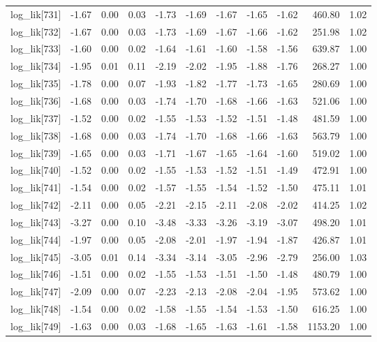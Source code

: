 \begin{table}[ht]
\begin{tabular}{rrrrrrrrrrr}
  log\_lik[731] & -1.67 & 0.00 & 0.03 & -1.73 & -1.69 & -1.67 & -1.65 & -1.62 & 460.80 & 1.02 \\ 
  log\_lik[732] & -1.67 & 0.00 & 0.03 & -1.73 & -1.69 & -1.67 & -1.66 & -1.62 & 251.98 & 1.02 \\ 
  log\_lik[733] & -1.60 & 0.00 & 0.02 & -1.64 & -1.61 & -1.60 & -1.58 & -1.56 & 639.87 & 1.00 \\ 
  log\_lik[734] & -1.95 & 0.01 & 0.11 & -2.19 & -2.02 & -1.95 & -1.88 & -1.76 & 268.27 & 1.00 \\ 
  log\_lik[735] & -1.78 & 0.00 & 0.07 & -1.93 & -1.82 & -1.77 & -1.73 & -1.65 & 280.69 & 1.00 \\ 
  log\_lik[736] & -1.68 & 0.00 & 0.03 & -1.74 & -1.70 & -1.68 & -1.66 & -1.63 & 521.06 & 1.00 \\ 
  log\_lik[737] & -1.52 & 0.00 & 0.02 & -1.55 & -1.53 & -1.52 & -1.51 & -1.48 & 481.59 & 1.00 \\ 
  log\_lik[738] & -1.68 & 0.00 & 0.03 & -1.74 & -1.70 & -1.68 & -1.66 & -1.63 & 563.79 & 1.00 \\ 
  log\_lik[739] & -1.65 & 0.00 & 0.03 & -1.71 & -1.67 & -1.65 & -1.64 & -1.60 & 519.02 & 1.00 \\ 
  log\_lik[740] & -1.52 & 0.00 & 0.02 & -1.55 & -1.53 & -1.52 & -1.51 & -1.49 & 472.91 & 1.00 \\ 
  log\_lik[741] & -1.54 & 0.00 & 0.02 & -1.57 & -1.55 & -1.54 & -1.52 & -1.50 & 475.11 & 1.01 \\ 
  log\_lik[742] & -2.11 & 0.00 & 0.05 & -2.21 & -2.15 & -2.11 & -2.08 & -2.02 & 414.25 & 1.02 \\ 
  log\_lik[743] & -3.27 & 0.00 & 0.10 & -3.48 & -3.33 & -3.26 & -3.19 & -3.07 & 498.20 & 1.01 \\ 
  log\_lik[744] & -1.97 & 0.00 & 0.05 & -2.08 & -2.01 & -1.97 & -1.94 & -1.87 & 426.87 & 1.01 \\ 
  log\_lik[745] & -3.05 & 0.01 & 0.14 & -3.34 & -3.14 & -3.05 & -2.96 & -2.79 & 256.00 & 1.03 \\ 
  log\_lik[746] & -1.51 & 0.00 & 0.02 & -1.55 & -1.53 & -1.51 & -1.50 & -1.48 & 480.79 & 1.00 \\ 
  log\_lik[747] & -2.09 & 0.00 & 0.07 & -2.23 & -2.13 & -2.08 & -2.04 & -1.95 & 573.62 & 1.00 \\ 
  log\_lik[748] & -1.54 & 0.00 & 0.02 & -1.58 & -1.55 & -1.54 & -1.53 & -1.50 & 616.25 & 1.00 \\ 
  log\_lik[749] & -1.63 & 0.00 & 0.03 & -1.68 & -1.65 & -1.63 & -1.61 & -1.58 & 1153.20 & 1.00 \\ 

\end{tabular}
\end{table}
